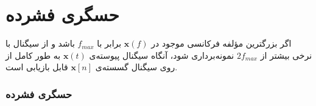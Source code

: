 \begin{frame}
\tableofcontents
\end{frame}


\section{حسگری فشرده\hfill}
\begin{frame}

\begin{theorem}
اگر بزرگترين مؤلفه فرکانسی موجود در
$\bm{x}(f)$
برابر با 
$f_{max}$
باشد  و از سيگنال با نرخی بیشتر از 
$2f_{max}$
نمونه‌برداری شود، آنگاه سیگنال پیوسته‌ی
$\bm{x}(t)$
به طور کامل از روی سیگنال گسسته‌ی
$\bm{x}[n]$
قابل بازیابی است.
\end{theorem}
\pause
\begin{figure}
	\centering
	
\end{figure}
\end{frame}
\begin{frame}
\frametitle{حسگری فشرده}

\begin{columns} 
\begin{figure}
	\centering
	
\end{figure}
\end{columns}
\end{frame}
